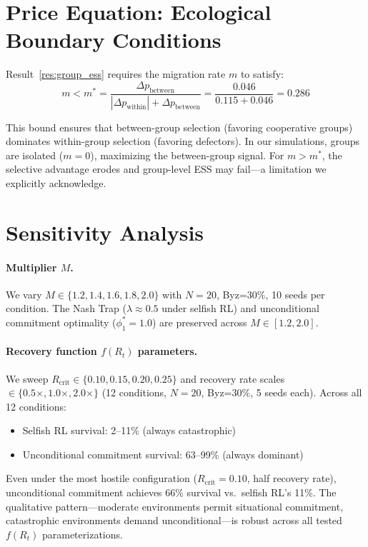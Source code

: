 \documentclass{article}
\begin{document}
\section{Price Equation: Ecological Boundary Conditions}
\label{app:price}

Result~\ref{res:group_ess} requires the migration rate $m$ to satisfy:
\begin{equation}
m < m^* = \frac{\Delta p_{\text{between}}}{|\Delta p_{\text{within}}| + \Delta p_{\text{between}}} = \frac{0.046}{0.115 + 0.046} = 0.286
\end{equation}

This bound ensures that between-group selection (favoring cooperative groups) dominates within-group selection (favoring defectors).
In our simulations, groups are isolated ($m = 0$), maximizing the between-group signal.
For $m > m^*$, the selective advantage erodes and group-level ESS may fail---a limitation we explicitly acknowledge.

\section{Sensitivity Analysis}
\label{app:sensitivity}

\paragraph{Multiplier $M$.}
We vary $M \in \{1.2, 1.4, 1.6, 1.8, 2.0\}$ with $N=20$, Byz=30\%, 10 seeds per condition.
The Nash Trap ($\lambda \approx 0.5$ under selfish RL) and unconditional commitment optimality ($\phi_1^* = 1.0$) are preserved across $M \in [1.2, 2.0]$.

\paragraph{Recovery function $f(R_t)$ parameters.}
We sweep $R_{\text{crit}} \in \{0.10, 0.15, 0.20, 0.25\}$ and recovery rate scales $\in \{0.5\times, 1.0\times, 2.0\times\}$ (12 conditions, $N=20$, Byz=30\%, 5 seeds each).
Across all 12 conditions:
\begin{itemize}
    \item Selfish RL survival: 2--11\% (always catastrophic)
    \item Unconditional commitment survival: 63--99\% (always dominant)
\end{itemize}
Even under the most hostile configuration ($R_{\text{crit}}=0.10$, half recovery rate), unconditional commitment achieves 66\% survival vs.\ selfish RL's 11\%.
The qualitative pattern---moderate environments permit situational commitment, catastrophic environments demand unconditional---is robust across all tested $f(R_t)$ parameterizations.
\end{document}
